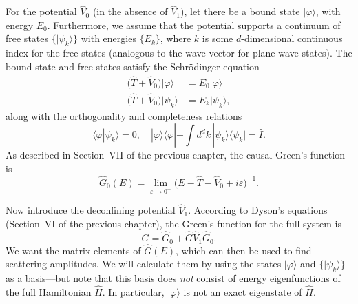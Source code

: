 \documentclass[pra,12pt]{revtex4}
\begin{document}
For the potential $\hat{V}_0$ (in the absence of $\hat{V}_1$), let
there be a bound state $|\varphi\rangle$, with energy $E_0$.
Furthermore, we assume that the potential supports a continuum of free
states $\{|\psi_k\rangle\}$ with energies $\{E_k\}$, where $k$ is some
$d$-dimensional continuous index for the free states (analogous to the
wave-vector for plane wave states).  The bound state and free states
satisfy the Schr\"odinger equation
\begin{align}
  \big(\hat{T} + \hat{V}_0\big) |\varphi\rangle \; &= E_0 |\varphi\rangle \\ \big(\hat{T} + \hat{V}_0\big) |\psi_k\rangle &= E_k |\psi_k\rangle,
\end{align}
along with the orthogonality and completeness relations
\begin{equation}
  \langle\varphi|\psi_k\rangle = 0, \quad |\varphi\rangle\langle\varphi| + \int d^dk\, |\psi_k\rangle\langle\psi_k| = \hat{I}.
\end{equation}
As described in Section~VII of the previous chapter, the causal
Green's function is
\begin{equation}
  \hat{G}_0(E) = \lim_{\varepsilon\rightarrow0^+} \Big(E - \hat{T} - \hat{V}_0 + i\varepsilon\Big)^{-1}.
\end{equation}

Now introduce the deconfining potential $\hat{V}_1$.  According to
Dyson's equations (Section~VI of the previous chapter), the Green's
function for the full system is
\begin{equation}
  \hat{G} = \hat{G}_0 + \hat{G} \hat{V}_1 \hat{G}_0.
\end{equation}
We want the matrix elements of $\hat{G}(E)$, which can then be used to
find scattering amplitudes.  We will calculate them by using the
states $|\varphi\rangle$ and $\{|\psi_k\rangle\}$ as a basis---but
note that this basis does \textit{not} consist of energy
eigenfunctions of the full Hamiltonian $\hat{H}$.  In particular,
$|\varphi\rangle$ is not an exact eigenstate of $\hat{H}$.
\end{document}
